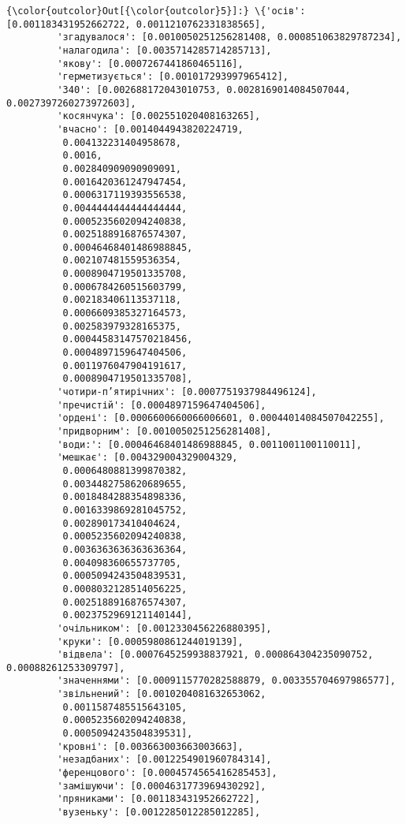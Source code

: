 \documentclass[11pt]{article}
\begin{document}
\begin{Verbatim}[commandchars=\\\{\}]
{\color{outcolor}Out[{\color{outcolor}5}]:} \{'осів': [0.001183431952662722, 0.0011210762331838565],
         'згадувалося': [0.0010050251256281408, 0.000851063829787234],
         'налагодила': [0.0035714285714285713],
         'якову': [0.0007267441860465116],
         'герметизується': [0.001017293997965412],
         '340': [0.002688172043010753, 0.0028169014084507044, 0.0027397260273972603],
         'косянчука': [0.002551020408163265],
         'вчасно': [0.0014044943820224719,
          0.004132231404958678,
          0.0016,
          0.002840909090909091,
          0.0016420361247947454,
          0.0006317119393556538,
          0.0044444444444444444,
          0.0005235602094240838,
          0.0025188916876574307,
          0.00046468401486988845,
          0.002107481559536354,
          0.0008904719501335708,
          0.0006784260515603799,
          0.002183406113537118,
          0.0006609385327164573,
          0.002583979328165375,
          0.00044583147570218456,
          0.0004897159647404506,
          0.0011976047904191617,
          0.0008904719501335708],
         'чотири-п’ятирічних': [0.0007751937984496124],
         'пречистій': [0.0004897159647404506],
         'ордені': [0.0006600660066006601, 0.00044014084507042255],
         'придворним': [0.0010050251256281408],
         'води:': [0.00046468401486988845, 0.0011001100110011],
         'мешкає': [0.004329004329004329,
          0.0006480881399870382,
          0.0034482758620689655,
          0.0018484288354898336,
          0.0016339869281045752,
          0.002890173410404624,
          0.0005235602094240838,
          0.0036363636363636364,
          0.004098360655737705,
          0.0005094243504839531,
          0.0008032128514056225,
          0.0025188916876574307,
          0.0023752969121140144],
         'очільником': [0.0012330456226880395],
         'круки': [0.0005980861244019139],
         'відвела': [0.0007645259938837921, 0.000864304235090752, 0.00088261253309797],
         'значеннями': [0.0009115770282588879, 0.003355704697986577],
         'звільнений': [0.0010204081632653062,
          0.0011587485515643105,
          0.0005235602094240838,
          0.0005094243504839531],
         'кровні': [0.003663003663003663],
         'незадбаних': [0.0012254901960784314],
         'ференцового': [0.0004574565416285453],
         'замішуючи': [0.0004631773969430292],
         'пряниками': [0.001183431952662722],
         'вузеньку': [0.0012285012285012285],

\end{Verbatim}
\end{document}
